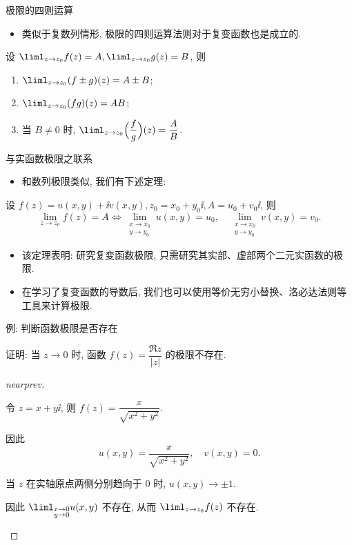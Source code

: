 \begin{frame}{极限的四则运算}
	\begin{itemize}
		\item 类似于复数列情形, 极限的四则运算法则对于复变函数也是成立的.
	\end{itemize}
	\onslide<+->
	\begin{theorem}
		设 $\liml_{z\to z_0}f(z)=A,\liml_{z\to z_0}g(z)=B$, 则
		\begin{enumerate}
			\item $\liml_{z\to z_0}(f\pm g)(z)=A\pm B$;
			\item $\liml_{z\to z_0}(fg)(z)=AB$;
			\item 当 $B\neq 0$ 时, $\liml_{z\to z_0}\Bigl(\dfrac fg\Bigr)(z)=\dfrac AB$.
		\end{enumerate}
	\end{theorem}
\end{frame}


\begin{frame}{与实函数极限之联系}
	\begin{itemize}
		\item 和数列极限类似, 我们有下述定理:
	\end{itemize}
	\onslide<+->
	\begin{theorem}
		设 $f(z)=u(x,y)+\ii v(x,y),z_0=x_0+y_0\ii,A=u_0+v_0\ii$, 则
		\[
			\lim_{z\to z_0}f(z)=A\iff
			\lim_{\substack{x\to x_0\\y\to y_0}}u(x,y)=u_0,\quad
			\lim_{\substack{x\to x_0\\y\to y_0}}v(x,y)=v_0.
		\]
	\end{theorem}
	\begin{itemize}
		\item 该定理表明: 研究复变函数极限, 只需研究其实部、虚部两个二元实函数的极限.
		\item 在学习了复变函数的导数后, 我们也可以使用等价无穷小替换、洛必达法则等工具来计算极限.
	\end{itemize}
\end{frame}


\begin{frame}{例: 判断函数极限是否存在}
	\onslide<+->
	\begin{example}[nearnext]
		证明: 当 $z\to0$ 时, 函数 $f(z)=\dfrac{\Re z}{|z|}$ 的极限不存在.
	\end{example}
	\onslide<+->
	\begin{proof}[nearprev]
		\begin{itemize*}
			\item 令 $z=x+y\ii$, 则 $f(z)=\dfrac x{\sqrt{x^2+y^2}}$.
			\item 因此
			\[
				u(x,y)=\frac x{\sqrt{x^2+y^2}},\quad v(x,y)=0.
			\]
			\item 当 $z$ 在实轴原点两侧分别趋向于 $0$ 时, $u(x,y)\to\pm1$.
			\item 因此 $\liml_{\substack{x\to 0\\y\to0}}u(x,y)$ 不存在, 从而 $\liml_{z\to z_0}f(z)$ 不存在.\qedhere
		\end{itemize*}
		\meddel
	\end{proof}
\end{frame}


